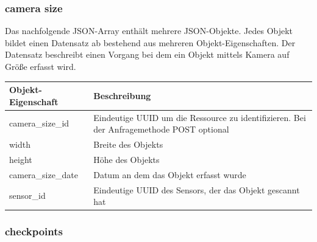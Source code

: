 \subsubsection{camera size}%
\label{sec:rest.json.camera_size}

Das nachfolgende JSON-Array enthält mehrere JSON-Objekte. Jedes Objekt bildet
einen Datensatz ab bestehend aus mehreren Objekt-Eigenschaften. Der Datensatz
beschreibt einen Vorgang bei dem ein Objekt mittels Kamera auf Größe erfasst
wird.

\begin{jsoncode}
\end{jsoncode}

\begin{table}[H]
  \begin{tabularx}{\textwidth}{lX}
    \textbf{Objekt-Eigenschaft} & \textbf{Beschreibung}                                                                     \\ \toprule
    camera\_size\_id            & Eindeutige UUID um die Ressource zu identifizieren. Bei der Anfragemethode POST optional  \\
    width                       & Breite des Objekts                                                                        \\
    height                      & Höhe des Objekts                                                                          \\
    camera\_size\_date          & Datum an dem das Objekt erfasst wurde                                                     \\
    sensor\_id                  & Eindeutige UUID des Sensors, der das Objekt gescannt hat                                  \\
  \end{tabularx}
\end{table}

\subsubsection{checkpoints}%
\label{sec:rest.json.checkpoints}

